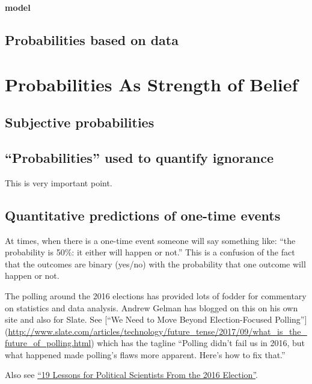 \documentclass[]{book}
\theoremstyle{definition}
\theoremstyle{definition}
\theoremstyle{definition}
\theoremstyle{remark}
\begin{document}
\textbf{model}

\subsection{Probabilities based on
data}\label{probabilities-based-on-data}

\section{Probabilities As Strength of
Belief}\label{probabilities-as-strength-of-belief}

\subsection{Subjective probabilities}\label{subjective-probabilities}

\subsection{\texorpdfstring{``Probabilities'' used to quantify
ignorance}{Probabilities used to quantify ignorance}}\label{probabilities-used-to-quantify-ignorance}

This is very important point.

\subsection{Quantitative predictions of one-time
events}\label{quantitative-predictions-of-one-time-events}

At times, when there is a one-time event someone will say something
like: ``the probability is 50\%: it either will happen or not.'' This is
a confusion of the fact that the outcomes are binary (yes/no) with the
probability that one outcome will happen or not.

The polling around the 2016 elections has provided lots of fodder for
commentary on statistics and data analysis. Andrew Gelman has blogged on
this on his own site and also for Slate. See {[}``We Need to Move Beyond
Election-Focused Polling''{]}
(\url{http://www.slate.com/articles/technology/future_tense/2017/09/what_is_the_future_of_polling.html})
which has the tagline ``Polling didn't fail us in 2016, but what
happened made polling's flaws more apparent. Here's how to fix that.''

Also see
\href{http://www.slate.com/articles/news_and_politics/politics/2016/12/_19_lessons_for_political_scientists_from_the_2016_election.html}{``19
Lessons for Political Scientists From the 2016 Election''}.
\end{document}
